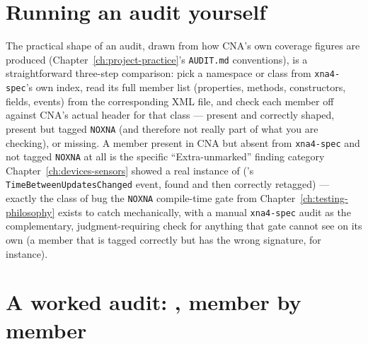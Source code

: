 \section{Running an audit yourself}

The practical shape of an audit, drawn from how CNA's own coverage figures are produced
(Chapter~\ref{ch:project-practice}'s \texttt{AUDIT.md} conventions), is a straightforward
three-step comparison: pick a namespace or class from \texttt{xna4-spec}'s own index, read
its full member list (properties, methods, constructors, fields, events) from the
corresponding XML file, and check each member off against CNA's actual header for that class
--- present and correctly shaped, present but tagged \texttt{NOXNA} (and therefore not really
part of what you are checking), or missing. A member present in CNA but absent from
\texttt{xna4-spec} and not tagged \texttt{NOXNA} at all is the specific ``Extra-unmarked''
finding category Chapter~\ref{ch:devices-sensors} showed a real instance of
('s \texttt{TimeBetweenUpdatesChanged} event, found and then correctly
retagged) --- exactly the class of bug the \texttt{NOXNA} compile-time gate from
Chapter~\ref{ch:testing-philosophy} exists to catch mechanically, with a manual
\texttt{xna4-spec} audit as the complementary, judgment-requiring check for anything that
gate cannot see on its own (a member that is tagged correctly but has the wrong signature, for
instance).

\section{A worked audit: , member by member}

